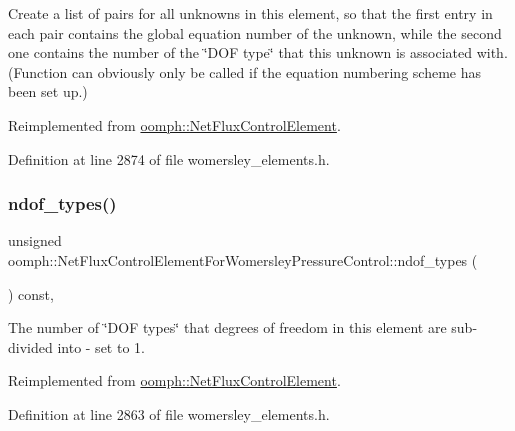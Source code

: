 Create a list of pairs for all unknowns in this element, so that the first entry in each pair contains the global equation number of the unknown, while the second one contains the number of the \char`\"{}\+D\+O\+F type\char`\"{} that this unknown is associated with. (Function can obviously only be called if the equation numbering scheme has been set up.) 



Reimplemented from \hyperlink{classoomph_1_1NetFluxControlElement_ac4eedd635a016d29fd9e6da5ae0f8707}{oomph\+::\+Net\+Flux\+Control\+Element}.



Definition at line 2874 of file womersley\+\_\+elements.\+h.

\mbox{\label{classoomph_1_1NetFluxControlElementForWomersleyPressureControl_a538b22e5aceecf140d03e400a8848a33}} 
\subsubsection{\texorpdfstring{ndof\+\_\+types()}{ndof\_types()}}
{\footnotesize\ttfamily unsigned oomph\+::\+Net\+Flux\+Control\+Element\+For\+Womersley\+Pressure\+Control\+::ndof\+\_\+types (\begin{DoxyParamCaption}{ }\end{DoxyParamCaption}) const\hspace{0.3cm}{\ttfamily [inline]}, {\ttfamily [virtual]}}



The number of \char`\"{}\+D\+O\+F types\char`\"{} that degrees of freedom in this element are sub-\/divided into -\/ set to 1. 



Reimplemented from \hyperlink{classoomph_1_1NetFluxControlElement_a16809a8ad123ba41f826d9e920aba9e0}{oomph\+::\+Net\+Flux\+Control\+Element}.



Definition at line 2863 of file womersley\+\_\+elements.\+h.

\mbox{\label{classoomph_1_1NetFluxControlElementForWomersleyPressureControl_a499dc308316bda2ce079d89773562418}} 
